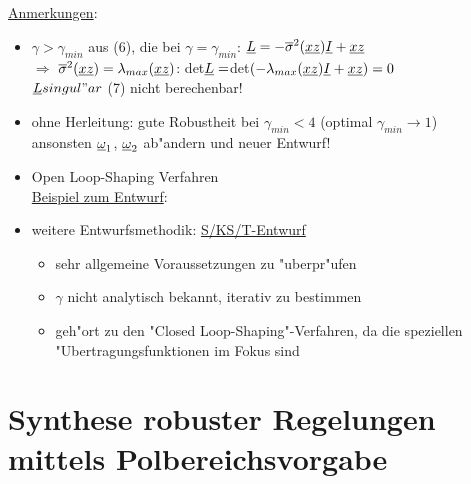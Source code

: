 \documentclass[openany,a4paper,11pt]{book}
\begin{document}
\uline{Anmerkungen}:\begin{itemize}
    \item $\gamma>\gamma_{min}$ aus (6), die bei $\gamma=\gamma_{min}$: $\uline{L}=-\overline{\sigma}^2(\uline{xz})\uline{I}+\uline{xz}$\\
    $\Rightarrow$ $\overline{\sigma}^2(\uline{xz})=\lambda_{max}(\uline{xz})$: det$\uline{L}=$det$(-\lambda_{max}(\uline{xz})\uline{I}+\uline{xz})=0$\\
    $\uline{L} singul"ar$ (7) nicht berechenbar!
    \item ohne Herleitung: gute Robustheit bei $\gamma_{min}<4$ (optimal $\gamma_{min}\rightarrow1$)\\
    ansonsten $\uline{\omega}_1$, $\uline{\omega}_2$ ab"andern und neuer Entwurf!
    \item Open Loop-Shaping Verfahren\\
    \uline{Beispiel zum Entwurf}:  
    \item weitere Entwurfsmethodik: \uline{S/KS/T-Entwurf}\begin{itemize}
        \item sehr allgemeine Voraussetzungen zu "uberpr"ufen
        \item $\gamma$ nicht analytisch bekannt, iterativ zu bestimmen
        \item geh"ort zu den "Closed Loop-Shaping"-Verfahren, da die speziellen "Ubertragungsfunktionen im Fokus sind
    \end{itemize}
\end{itemize}
\section{Synthese robuster Regelungen mittels Polbereichsvorgabe}
\end{document}
